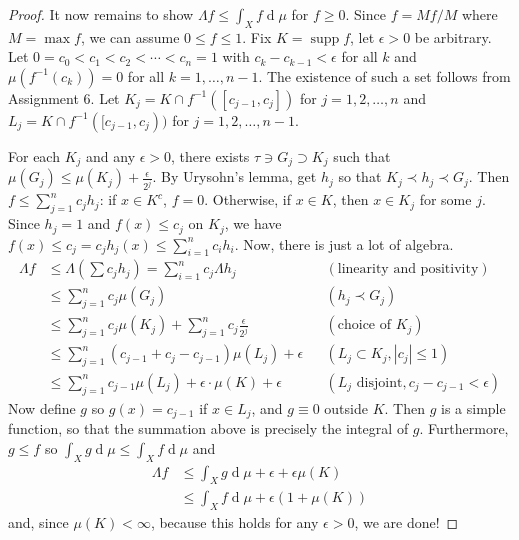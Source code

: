 \documentclass[12pt, a4paper]{book}
\DeclareMathOperator{\supp}{supp}
\renewcommand{\d}[1]{\ensuremath{\operatorname{d}\!{#1}}} %
\theoremstyle{nonumberplain}
\newtheorem{proof}{Proof}
\begin{document}
\begin{proof}
    It now remains to show $\Lambda f\leq\int_X f\d{\mu}$ for $f\geq 0$.
    Since $f=Mf/M$ where $M=\max f$, we can assume $0\leq f\leq 1$.
    Fix $K=\supp f$, let $\epsilon>0$ be arbitrary.
    Let $0=c_0<c_1<c_2<\cdots<c_n=1$ with $c_k-c_{k-1}<\epsilon$ for all $k$ and $\mu(f^{-1}(c_k))=0$ for all $k=1,\ldots,n-1$.
    The existence of such a set follows from Assignment 6.
    Let $K_j=K\cap f^{-1}([c_{j-1},c_j])$ for $j=1,2,\ldots,n$ and $L_j=K\cap f^{-1}([c_{j-1},c_j))$ for $j=1,2,\ldots,n-1$. %

    For each $K_j$ and any $\epsilon>0$, there exists $\tau\ni G_j\supset K_j$ such that $\mu(G_j)\leq\mu(K_j)+\frac{\epsilon}{2^j}$.
    By Urysohn's lemma, get $h_j$ so that $K_j\prec h_j\prec G_j$.
    Then $f\leq\sum_{j=1}^nc_j h_j$: if $x\in K^c$, $f=0$.
    Otherwise, if $x\in K$, then $x\in K_j$ for some $j$.
    Since $h_j=1$ and $f(x)\leq c_j$ on $K_j$, we have $f(x)\leq c_j=c_jh_j(x)\leq\sum_{i=1}^n c_ih_i$.
    Now, there is just a lot of algebra.
    \begin{align*}
        \Lambda f&\leq\Lambda\left(\sum c_j h_j\right)=\sum\limits_{i=1}^n c_j\Lambda h_j&&(\text{linearity and positivity})\\
                 &\leq\sum\limits_{j=1}^n c_j\mu(G_j)&&(h_j\prec G_j)\\
                 &\leq \sum\limits_{j=1}^n c_j\mu(K_j)+\sum\limits_{j=1}^nc_j\frac{\epsilon}{2^j}&&(\text{choice of $K_j$})\\
                 &\leq \sum\limits_{j=1}^n (c_{j-1}+c_j-c_{j-1})\mu(L_j)+\epsilon&&(L_j\subset K_j,|c_j|\leq 1)\\
                 &\leq \sum\limits_{j=1}^n c_{j-1}\mu(L_j)+\epsilon\cdot\mu(K)+\epsilon&&(L_j\text{ disjoint},c_j-c_{j-1}<\epsilon)
    \end{align*}
    Now define $g$ so $g(x)=c_{j-1}$ if $x\in L_j$, and $g\equiv 0$ outside $K$.
    Then $g$ is a simple function, so that the summation above is precisely the integral of $g$.
    Furthermore, $g\leq f$ so $\int_X g\d{\mu}\leq\int_X f\d{\mu}$ and
    \begin{align*}
        \Lambda f &\leq \int_X g\d{\mu}+\epsilon+\epsilon\mu(K)\\
                  &\leq \int_X f\d{\mu}+\epsilon(1+\mu(K))
    \end{align*}
    and, since $\mu(K)<\infty$, because this holds for any $\epsilon>0$, we are done!
\end{proof}
\end{document}
